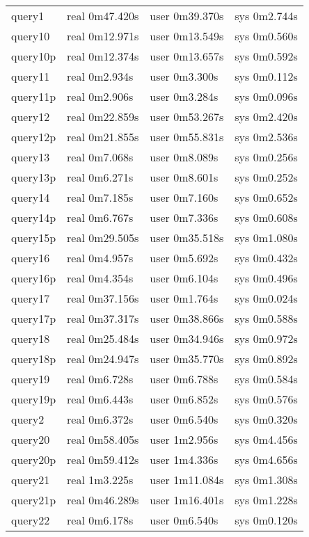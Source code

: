 \begin{tabular}{p{}|p{}|p{}|p{}}
query1 & real 0m47.420s & user 0m39.370s & sys 0m2.744s\\
query10 & real 0m12.971s & user 0m13.549s & sys 0m0.560s\\
query10p & real 0m12.374s & user 0m13.657s & sys 0m0.592s\\
query11 & real 0m2.934s & user 0m3.300s & sys 0m0.112s\\
query11p & real 0m2.906s & user 0m3.284s & sys 0m0.096s\\
query12 & real 0m22.859s & user 0m53.267s & sys 0m2.420s\\
query12p & real 0m21.855s & user 0m55.831s & sys 0m2.536s\\
query13 & real 0m7.068s & user 0m8.089s & sys 0m0.256s\\
query13p & real 0m6.271s & user 0m8.601s & sys 0m0.252s\\
query14 & real 0m7.185s & user 0m7.160s & sys 0m0.652s\\
query14p & real 0m6.767s & user 0m7.336s & sys 0m0.608s\\
query15p & real 0m29.505s & user 0m35.518s & sys 0m1.080s\\
query16 & real 0m4.957s & user 0m5.692s & sys 0m0.432s\\
query16p & real 0m4.354s & user 0m6.104s & sys 0m0.496s\\
query17 & real 0m37.156s & user 0m1.764s & sys 0m0.024s\\
query17p & real 0m37.317s & user 0m38.866s & sys 0m0.588s\\
query18 & real 0m25.484s & user 0m34.946s & sys 0m0.972s\\
query18p & real 0m24.947s & user 0m35.770s & sys 0m0.892s\\
query19 & real 0m6.728s & user 0m6.788s & sys 0m0.584s\\
query19p & real 0m6.443s & user 0m6.852s & sys 0m0.576s\\
query2 & real 0m6.372s & user 0m6.540s & sys 0m0.320s\\
query20 & real 0m58.405s & user 1m2.956s & sys 0m4.456s\\
query20p & real 0m59.412s & user 1m4.336s & sys 0m4.656s\\
query21 & real 1m3.225s & user 1m11.084s & sys 0m1.308s\\
query21p & real 0m46.289s & user 1m16.401s & sys 0m1.228s\\
query22 & real 0m6.178s & user 0m6.540s & sys 0m0.120s\\

\end{tabular}
